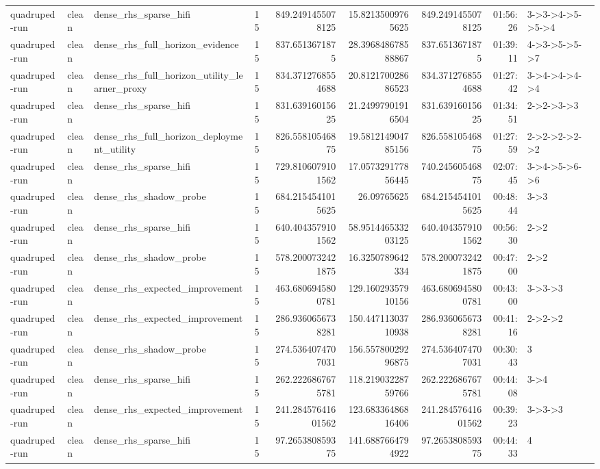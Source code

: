 \begin{tabular}{llllrrrrl}
quadruped-run & clean & dense\_rhs\_sparse\_hifi & 15 & 849.2491455078125 & 15.82135009765625 & 849.2491455078125 & 01:56:26 & 3->3->4->5->5->4 \\
quadruped-run & clean & dense\_rhs\_full\_horizon\_evidence & 15 & 837.6513671875 & 28.396848678588867 & 837.6513671875 & 01:39:11 & 4->3->5->5->7 \\
quadruped-run & clean & dense\_rhs\_full\_horizon\_utility\_learner\_proxy & 15 & 834.3712768554688 & 20.812170028686523 & 834.3712768554688 & 01:27:42 & 3->4->4->4->4 \\
quadruped-run & clean & dense\_rhs\_sparse\_hifi & 15 & 831.63916015625 & 21.24997901916504 & 831.63916015625 & 01:34:51 & 2->2->3->3 \\
quadruped-run & clean & dense\_rhs\_full\_horizon\_deployment\_utility & 15 & 826.55810546875 & 19.581214904785156 & 826.55810546875 & 01:27:59 & 2->2->2->2->2 \\
quadruped-run & clean & dense\_rhs\_sparse\_hifi & 15 & 729.8106079101562 & 17.057329177856445 & 740.24560546875 & 02:07:45 & 3->4->5->6->6 \\
quadruped-run & clean & dense\_rhs\_shadow\_probe & 15 & 684.2154541015625 & 26.09765625 & 684.2154541015625 & 00:48:44 & 3->3 \\
quadruped-run & clean & dense\_rhs\_sparse\_hifi & 15 & 640.4043579101562 & 58.951446533203125 & 640.4043579101562 & 00:56:30 & 2->2 \\
quadruped-run & clean & dense\_rhs\_shadow\_probe & 15 & 578.2000732421875 & 16.3250789642334 & 578.2000732421875 & 00:47:00 & 2->2 \\
quadruped-run & clean & dense\_rhs\_expected\_improvement & 15 & 463.6806945800781 & 129.16029357910156 & 463.6806945800781 & 00:43:00 & 3->3->3 \\
quadruped-run & clean & dense\_rhs\_expected\_improvement & 15 & 286.9360656738281 & 150.44711303710938 & 286.9360656738281 & 00:41:16 & 2->2->2 \\
quadruped-run & clean & dense\_rhs\_shadow\_probe & 15 & 274.5364074707031 & 156.55780029296875 & 274.5364074707031 & 00:30:43 & 3 \\
quadruped-run & clean & dense\_rhs\_sparse\_hifi & 15 & 262.2226867675781 & 118.21903228759766 & 262.2226867675781 & 00:44:08 & 3->4 \\
quadruped-run & clean & dense\_rhs\_expected\_improvement & 15 & 241.28457641601562 & 123.68336486816406 & 241.28457641601562 & 00:39:23 & 3->3->3 \\
quadruped-run & clean & dense\_rhs\_sparse\_hifi & 15 & 97.265380859375 & 141.6887664794922 & 97.265380859375 & 00:44:33 & 4 \\

\end{tabular}
